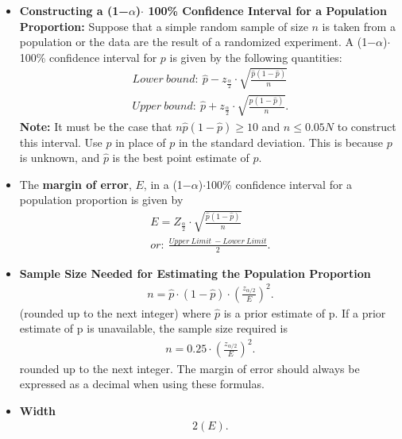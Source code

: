\documentclass{report}
\begin{document}
        \pagebreak \bigbreak \noindent 
        \begin{itemize}
            \item  \textbf{Constructing a (1−$\alpha $)$\cdot$ 100\% Confidence Interval for a Population Proportion:}
            Suppose that a simple random sample of size $n $ is taken from a population or the data are the result of a randomized experiment. A (1−$\alpha $)$\cdot  $100\% confidence interval for $p $ is given by the following quantities:
          \begin{align*}
              Lower\ bound:\ \hat{p} - z_{\frac{\alpha}{2}} \cdot \sqrt{\frac{\hat{p}(1 - \hat{p})}{n}}  \\
              Upper\ bound:\ \hat{p} + z_{\frac{\alpha}{2}} \cdot \sqrt{\frac{\hat{p}(1 - \hat{p})}{n}}
          .\end{align*}
          \textbf{Note:} It must be the case that $n\hat{p}(1-\hat{p})\geq 10$ and $n \leq 0.05N$ to construct this interval. Use $\hat{p}$ in place of $p$ in the standard deviation. This is because $p$ is unknown, and $\hat{p}$ is the best point estimate of $p$.
          \item The \textbf{margin of error}, $E $, in a (1−$\alpha $)$\cdot  $100\% confidence interval for a population proportion is given by
          \begin{align*}
              E = Z_{\frac{\alpha}{2}} \cdot \sqrt{\frac{\hat{p}(1-\hat{p})}{n}} \\
              or:\ \frac{Upper\ Limit\ - Lower\ Limit}{2}
          .\end{align*}
      \item \textbf{Sample Size Needed for Estimating the Population Proportion}
          \begin{align*}
              n = \hat{p} \cdot (1 - \hat{p}) \cdot \left(\frac{z_{\alpha/2}}{E}\right)^2 
          .\end{align*}
          (rounded up to the next integer) where $\hat{p}$ is a prior estimate of p.
          \bigbreak \noindent 
          If a prior estimate of p is unavailable, the sample size required is
          \begin{align*}
              n = 0.25 \cdot \left(\frac{z_{\alpha/2}}{E}\right)^2
          .\end{align*}
          rounded up to the next integer. The margin of error should always be expressed as a decimal when using these formulas.
        \item \textbf{Width}
            \begin{align*}
                2(E)
            .\end{align*}
      \end{itemize}
\end{document}
